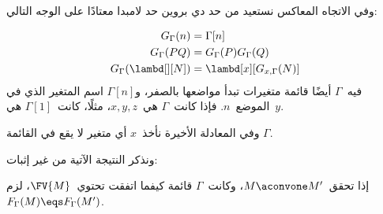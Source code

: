 \documentclass[../../../include/open-logic-section]{subfiles}
\begin{document}
وفي الاتجاه المعاكس نستعيد من حد دي بروين حد لامبدا معتادًا على الوجه التالي:

\begin{defn}
  \begin{align*}
    G_\Gamma(n) &= \Gamma[n] \\
    G_\Gamma(PQ) &= G_\Gamma(P) G_\Gamma(Q) \\
    G_\Gamma(\lambd[][N]) &= \lambd[x][G_{x,\Gamma}(N)]
  \end{align*}
  فيه~$\Gamma$ أيضًا قائمة متغيرات تبدأ مواضعها بالصفر، و$\Gamma[n]$
  اسم المتغير الذي في الموضع~$n$.
  فإذا كانت~$\Gamma$ هي~$x,y,z$، مثلًا، كانت~$\Gamma[1]$ هي~$y$.

  وفي المعادلة الأخيرة نأخذ~$x$ أي متغير لا يقع في القائمة
  $\Gamma$.
\end{defn}

ونذكر النتيجة الآتية من غير إثبات:

\begin{prop}
  إذا تحقق~$M \aconvone M'$، وكانت~$\Gamma$ قائمة كيفما اتفقت تحتوي~$\FV{M}$، لزم
  $F_\Gamma(M) \eqs F_\Gamma(M')$.
\end{prop}
\end{document}
